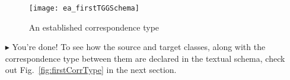 \begin{itemize}
\vspace{0.5cm}

\begin{figure}[htbp]
\begin{center}
  \texttt{[image: ea\_firstTGGSchema]}
  \caption{An established correspondence type} 
  \label{fig:ea_firstCorrType}
\end{center}
\end{figure}

\item[$\blacktriangleright$] You're done! To see how the source and target classes, along with the correspondence type between them are declared in the textual
schema, check out Fig.~\ref{fig:firstCorrType} in the next section.



\end{itemize}

